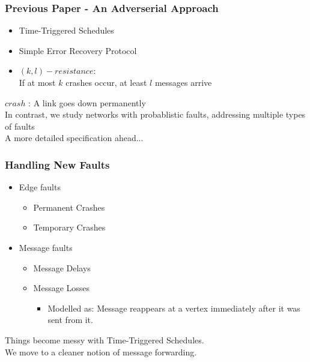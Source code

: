 \documentclass{beamer}
\begin{document}
\begin{frame}
\frametitle{Previous Paper - An Adverserial Approach}
	\begin{itemize}
	\item Time-Triggered Schedules
	\item Simple Error Recovery Protocol %
	\item $(k,l)-resistance$:	\\
	If at most $k$ crashes occur, at least $l$ messages arrive\\[3ex]
	\end{itemize}
	\hspace*{20pt}$ crash $ : A link goes down permanently\\[3ex]
	\pause
	\color{blue}
	In contrast, we study networks with probablistic faults, addressing multiple types of faults\\
	A more detailed specification ahead...
\end{frame}

\begin{frame}
\frametitle{Handling New Faults}
	\begin{itemize}
	\item Edge faults
	\begin{itemize}
		\item Permanent Crashes
		\pause
		\item Temporary Crashes
	\end{itemize}
	\item Message faults
	\begin{itemize}
		\item Message Delays
		\item Message Losses
		\pause
		\begin{itemize}
			\item Modelled as: Message reappears at a vertex immediately after it was sent from it.\\[2ex]
		\end{itemize}
	\end{itemize}
	\end{itemize}
	\pause
	\begin{center}
	\color{red}
	Things become messy with Time-Triggered Schedules.\\We move to a cleaner notion of message forwarding.
	\end{center}
\end{frame}
\end{document}
